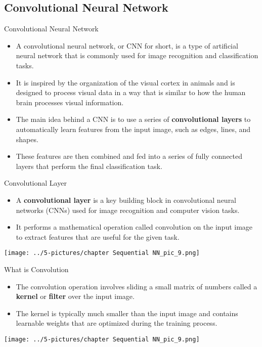 \documentclass[11pt]{beamer}
\begin{document}
\subsection{Convolutional Neural Network \\ \scalebox{0.8}{}}
%
\begin{frame}{Convolutional Neural Network}
\begin{itemize}
\item A convolutional neural network, or CNN for short, is a type of artificial neural network that is commonly used for image recognition and classification tasks. 
\item It is inspired by the organization of the visual cortex in animals and is designed to process visual data in a way that is similar to how the human brain processes visual information.

\item The main idea behind a CNN is to use a series of \textbf{convolutional layers} to automatically learn features from the input image, such as edges, lines, and shapes. 
\item These features are then combined and fed into a series of fully connected layers that perform the final classification task.
\end{itemize}
\end{frame}
\begin{frame}{Convolutional Layer}
\footnotesize{
\begin{itemize}
\item A \textbf{convolutional layer} is a key building block in convolutional neural networks (CNNs) used for image recognition and computer vision tasks. 
\item It performs a mathematical operation called convolution on the input image to extract features that are useful for the given task.
\end{itemize}}
	\begin{center}
	\texttt{[image: ../5-pictures/chapter Sequential NN\_pic\_9.png]}
	\end{center}
\end{frame}
\begin{frame}{What is Convolution}
\footnotesize{
\begin{itemize}
\item The convolution operation involves sliding a small matrix of numbers called a \textbf{kernel} or \textbf{filter} over the input image. 
\item The kernel is typically much smaller than the input image and contains learnable weights that are optimized during the training process. 
\end{itemize}}
	\begin{center}
	\texttt{[image: ../5-pictures/chapter Sequential NN\_pic\_9.png]}
	\end{center}
\end{frame}
\end{document}
